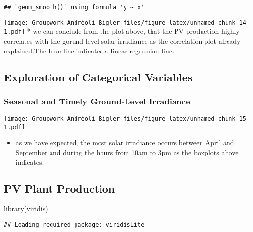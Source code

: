 \documentclass[
]{article}
\newenvironment{Shaded}{\begin{snugshade}}{\end{snugshade}}
\newcommand{\FunctionTok}[1]{\textcolor[rgb]{0.00,0.00,0.00}{#1}}
\newcommand{\NormalTok}[1]{#1}
\providecommand{\tightlist}{%
  \setlength{\itemsep}{0pt}\setlength{\parskip}{0pt}}
\begin{document}
\begin{verbatim}
## `geom_smooth()` using formula 'y ~ x'
\end{verbatim}

\texttt{[image: Groupwork\_Andréoli\_Bigler\_files/figure-latex/unnamed-chunk-14-1.pdf]}
* we can conclude from the plot above, that the PV production highly
correlates with the gorund level solar irradiance as the correlation
plot already explained.The blue line indicates a linear regression line.

\hypertarget{exploration-of-categorical-variables}{%
\subsection{Exploration of Categorical
Variables}\label{exploration-of-categorical-variables}}

\hypertarget{seasonal-and-timely-ground-level-irradiance}{%
\subsubsection{Seasonal and Timely Ground-Level
Irradiance}\label{seasonal-and-timely-ground-level-irradiance}}

\texttt{[image: Groupwork\_Andréoli\_Bigler\_files/figure-latex/unnamed-chunk-15-1.pdf]}

\begin{itemize}
\tightlist
\item
  as we have expected, the most solar irradiance occurs between April
  and September and during the hours from 10am to 3pm as the boxplots
  above indicates.
\end{itemize}

\newpage

\hypertarget{pv-plant-production}{%
\subsection{PV Plant Production}\label{pv-plant-production}}

\begin{Shaded}
\begin{Highlighting}[]
\FunctionTok{library}\NormalTok{(viridis)}
\end{Highlighting}
\end{Shaded}

\begin{verbatim}
## Loading required package: viridisLite
\end{verbatim}
\end{document}
